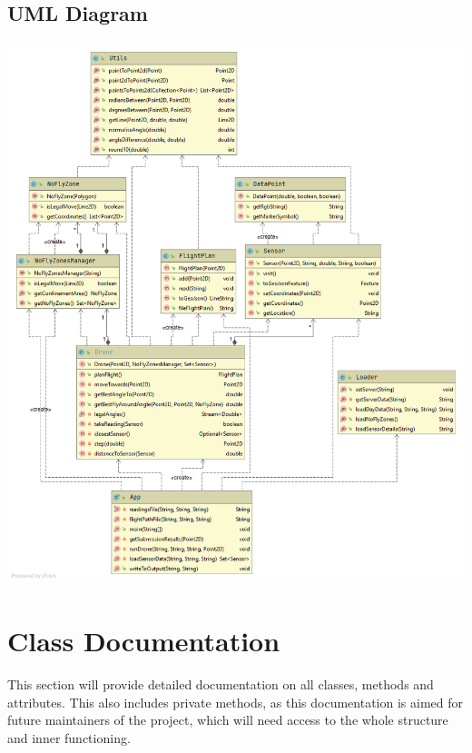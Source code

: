 \documentclass{article}
\begin{document}
\subsection{UML Diagram}
\label{UML Diagram}
\begin{description}
    \begin{center}
        \includegraphics[scale=0.45]{cw2/ilp-report/Package aqmaps.png}
    \end{center}
\end{description} 

\pagebreak

\section{Class Documentation}
This section will provide detailed documentation on all classes, methods and attributes. This also includes private methods, as this documentation is aimed for future maintainers of the project, which will need access to the whole structure and inner functioning.
\end{document}
